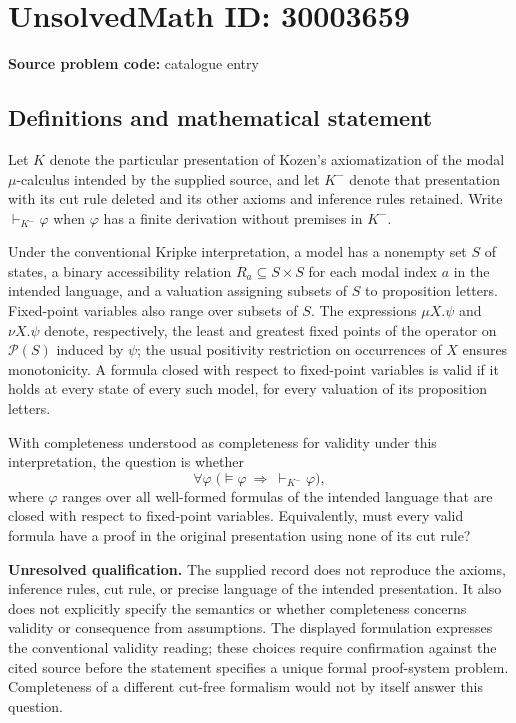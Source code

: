 \documentclass[11pt]{article}
\begin{document}
\section*{UnsolvedMath ID: 30003659}
\textbf{Source problem code:} catalogue entry
\subsection{Definitions and mathematical statement}
Let \(K\) denote the particular presentation of Kozen's axiomatization of the modal \(\mu\)-calculus intended by the supplied source, and let \(K^{-}\) denote that presentation with its cut rule deleted and its other axioms and inference rules retained. Write \(\vdash_{K^{-}}\varphi\) when \(\varphi\) has a finite derivation without premises in \(K^{-}\).

Under the conventional Kripke interpretation, a model has a nonempty set \(S\) of states, a binary accessibility relation \(R_a\subseteq S\times S\) for each modal index \(a\) in the intended language, and a valuation assigning subsets of \(S\) to proposition letters. Fixed-point variables also range over subsets of \(S\). The expressions \(\mu X.\psi\) and \(\nu X.\psi\) denote, respectively, the least and greatest fixed points of the operator on \(\mathcal P(S)\) induced by \(\psi\); the usual positivity restriction on occurrences of \(X\) ensures monotonicity. A formula closed with respect to fixed-point variables is valid if it holds at every state of every such model, for every valuation of its proposition letters.

With completeness understood as completeness for validity under this interpretation, the question is whether
\[
\forall\varphi\;\bigl(\models\varphi\ \Longrightarrow\ \vdash_{K^{-}}\varphi\bigr),
\]
where \(\varphi\) ranges over all well-formed formulas of the intended language that are closed with respect to fixed-point variables. Equivalently, must every valid formula have a proof in the original presentation using none of its cut rule?

\textbf{Unresolved qualification.} The supplied record does not reproduce the axioms, inference rules, cut rule, or precise language of the intended presentation. It also does not explicitly specify the semantics or whether completeness concerns validity or consequence from assumptions. The displayed formulation expresses the conventional validity reading; these choices require confirmation against the cited source before the statement specifies a unique formal proof-system problem. Completeness of a different cut-free formalism would not by itself answer this question.
\end{document}

